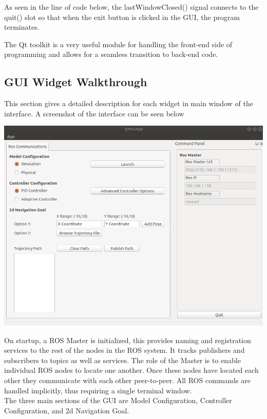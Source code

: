 \documentclass[12]{article}
\begin{document}
As seen in the line of code below, the lastWindowClosed() signal connects to the quit() slot so that when the exit button is clicked in the GUI, the program terminates.

The Qt toolkit is a very useful module for handling the front-end side of programming and allows for a seamless transition to back-end code.

\subsection{GUI Widget Walkthrough}
This section gives a detailed description for each widget in main window of the interface. A screenshot of the interface can be seen below
\begin{center}
\includegraphics[width=0.9\linewidth]{images/gui_screenshot.png} \\
\end{center}
On startup, a ROS Master is initialized, this provides naming and registration services to the rest of the nodes in the ROS system. It tracks publishers and subscribers to topics as well as services. The role of the Master is to enable individual ROS nodes to locate one another. Once these nodes have located each other they communicate with each other peer-to-peer. All ROS commands are handled implicitly, thus requiring a single terminal window.\\

The three main sections of the GUI are Model Configuration, Controller Configuration, and 2d Navigation Goal.\\
\end{document}
